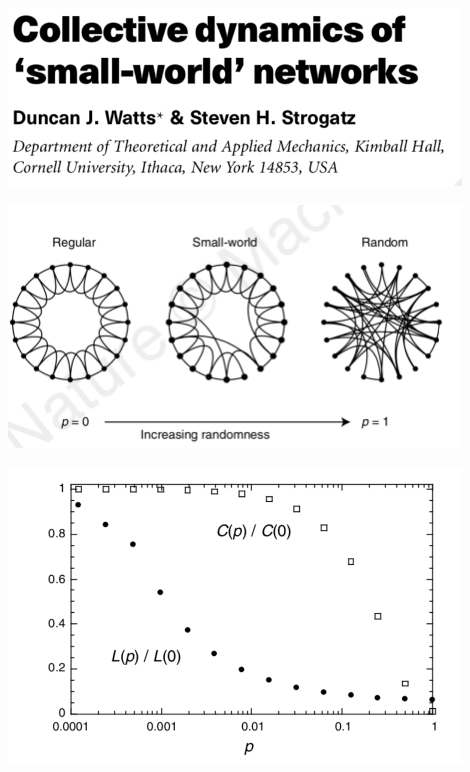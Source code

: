 \documentclass[aspectratio=169]{beamer}
\begin{document}
\begin{frame}

\begin{center}
\includegraphics[width = 0.9\textwidth]{figures/watts_collective_1998_title}
\end{center}

\end{frame}
\begin{frame}

\begin{center}
\includegraphics[width = 0.9\textwidth]{figures/watts_collective_1998_fig1}
\end{center}

\end{frame}
\begin{frame}

\begin{center}
\includegraphics[width = 0.9\textwidth]{figures/watts_collective_1998_fig2}
\end{center}

\end{frame}
\end{document}
